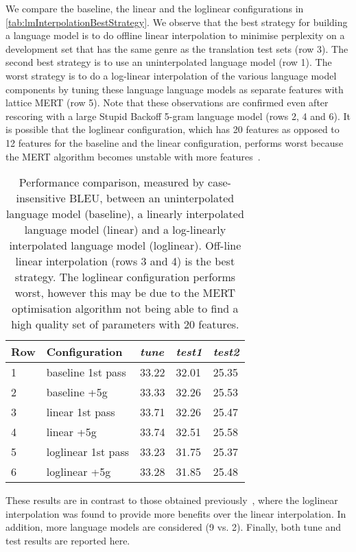 We compare the baseline, the linear and the loglinear configurations
in \autoref{tab:lmInterpolationBestStrategy}.
We observe that the best strategy for
building a language model is to do offline linear interpolation to minimise
perplexity on a development set that has the same genre as the translation
test sets (row 3). The second best strategy is to use an uninterpolated
language model (row 1). The worst strategy is to do a log-linear interpolation
of the various language model components by tuning these language
language models as separate features with lattice MERT (row 5). Note that
these observations are confirmed even after rescoring with a large
Stupid Backoff 5-gram language model (rows 2, 4 and 6).
It is possible that the loglinear configuration, which has 20 features as opposed
to 12 features for the baseline and the linear configuration, performs worst because
the MERT algorithm
becomes unstable with more features~\citep{foster-kuhn:2009:WMT}.
%
\begin{table}
  \begin{center}
    \begin{tabular}{l|l|lll}
      Row & Configuration & \emph{tune} & \emph{test1} & \emph{test2} \\
      \hline
      1 & baseline 1st pass & 33.22 & 32.01 & 25.35 \\
      2 & baseline +5g & 33.33 & 32.26 & 25.53 \\
      \hline
      3 & linear 1st pass & 33.71 & 32.26 & 25.47 \\
      4 & linear +5g & 33.74 & 32.51 & 25.58 \\
      \hline
      5 & loglinear 1st pass & 33.23 & 31.75 & 25.37 \\
      6 & loglinear +5g & 33.28 & 31.85 & 25.48
    \end{tabular}
    \caption{Performance comparison, measured by case-insensitive BLEU, between an uninterpolated language model (baseline), a
    linearly interpolated language model (linear) and a log-linearly interpolated language model (loglinear).
    Off-line linear interpolation (rows 3 and 4) is the best strategy. The loglinear configuration performs worst, however this
    may be due to the MERT optimisation algorithm not being able to find a high quality
    set of parameters with 20 features.}
    \label{tab:lmInterpolationBestStrategy}
  \end{center}
\end{table}
%
These results are in contrast to those obtained
previously~\citep{koehn-schroeder:2007:WMT}, where the loglinear interpolation
was found to provide more benefits over the linear interpolation. In addition,
more language models are considered (9 vs. 2). Finally,
both tune and test results are reported here.

